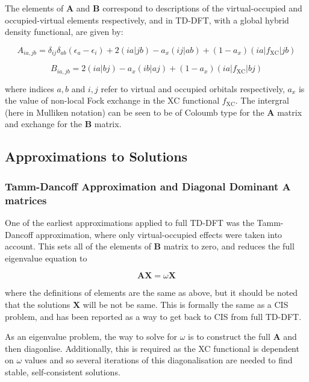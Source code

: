 The elements of $\mathbf{A}$ and $\mathbf{B}$ correspond to descriptions of the
virtual-occupied and occupied-virtual elements respectively, and in TD-DFT, with a 
global hybrid density functional, are given by:

\begin{equation}
A_{ia,jb} = \delta_{ij} \delta_{ab} \left( \epsilon_a - \epsilon_i \right) + 2\left(ia|jb\right) - a_x\left(ij|ab\right) + (1- a_x)\left(ia|f_{\text{XC}}|jb\right)
\end{equation}

\begin{equation}
B_{ia,jb} = 2\left(ia|bj\right) - a_x\left(ib|aj\right) + (1- a_x)\left(ia|f_{\text{XC}}|bj\right)
\end{equation}

where indices $a,b$ and $i,j$ refer to virtual and occupied orbitals respectively, 
$a_x$ is the value of non-local Fock exchange in the XC functional $f_{\text{XC}}$.
The intergral (here in Mulliken notation) can be seen to be of Coloumb type for 
the $\mathbf{A}$ matrix and exchange for the $\mathbf{B}$ matrix.

\subsection{Approximations to Solutions}
\label{subsec:chl_approxs}

\subsubsection{Tamm-Dancoff Approximation and Diagonal Dominant $\mathbf{A}$ matrices}
\label{subsubsec:Tamm_Dancoff}

One of the earliest approximations applied to full TD-DFT was the Tamm-Dancoff
approximation, where only virtual-occupied effects were taken into account. This
sets all of the elements of $\mathbf{B}$ matrix to zero, and reduces the full
eigenvalue equation to 

\begin{equation}
\mathbf{A} \mathbf{X} = \omega \mathbf{X}
\end{equation}

where the definitions of elements are the same as above, but it should be noted 
that the solutions $\mathbf{X}$ will be not be same. This is formally the same as
a CIS problem, and has been reported as a way to get back to CIS from full
TD-DFT.

As an eigenvalue problem, the way to solve for $\omega$ is to construct the full
$\mathbf{A}$ and then diagonlise. Additionally, this is required as the XC functional
is dependent on $\omega$ values and so several iterations of this diagonalisation 
are needed to find stable, self-consistent solutions.

